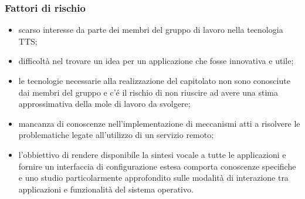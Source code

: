 \documentclass[12pt,a4paper]{article}
\begin{document}
\subsubsection{Fattori di rischio}
\begin{itemize}
\item scarso interesse da parte dei membri del gruppo di lavoro nella tecnologia TTS;
\item difficoltà nel trovare un idea per un applicazione che fosse innovativa e utile;
\item le tecnologie necessarie alla realizzazione del capitolato non sono conosciute dai membri del gruppo e c'é il rischio di non riuscire ad avere una stima approssimativa della mole di lavoro da svolgere;
\item mancanza di conoscenze nell'implementazione di meccanismi atti a risolvere le problematiche legate all'utilizzo di un servizio remoto;
\item l'obbiettivo di rendere disponibile la sintesi vocale a tutte le applicazioni e fornire un interfaccia di configurazione estesa comporta conoscenze specifiche e uno studio particolarmente approfondito sulle modalità di interazione tra applicazioni e funzionalità del sistema operativo.
\end{itemize}
\end{document}
